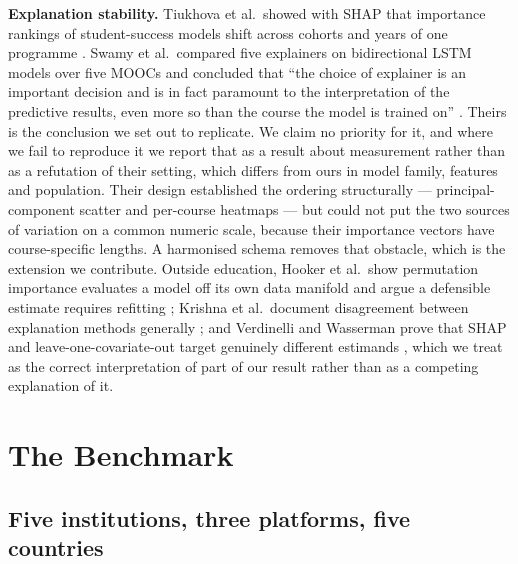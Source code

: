 \documentclass[conference]{IEEEtran}
\begin{document}
\textbf{Explanation stability.} Tiukhova et al.\ showed with SHAP that importance
rankings of student-success models shift across cohorts and years of one
programme \cite{tiukhova2024}. Swamy et al.\ compared five explainers on
bidirectional LSTM models over five MOOCs and concluded that ``the choice of
explainer is an important decision and is in fact paramount to the interpretation
of the predictive results, even more so than the course the model is trained on''
\cite{swamy2022}. Theirs is the conclusion we set out to replicate. We claim no priority for it, and where we fail to reproduce it we report that as a result about measurement rather than as a refutation of their setting, which differs from ours in model family, features and population. Their design established the ordering
structurally --- principal-component scatter and per-course heatmaps --- but
could not put the two sources of variation on a common numeric scale, because
their importance vectors have course-specific lengths. A harmonised schema
removes that obstacle, which is the extension we contribute. Outside education,
Hooker et al.\ show permutation importance evaluates a model off its own data
manifold and argue a defensible estimate requires refitting \cite{hooker2021};
Krishna et al.\ document disagreement between explanation methods generally
\cite{krishna2022}; and Verdinelli and Wasserman prove that SHAP and
leave-one-covariate-out target genuinely different estimands
\cite{verdinelli2024}, which we treat as the correct interpretation of part of
our result rather than as a competing explanation of it.

\section{The Benchmark}\label{sec:data}

\subsection{Five institutions, three platforms, five countries}
\end{document}
